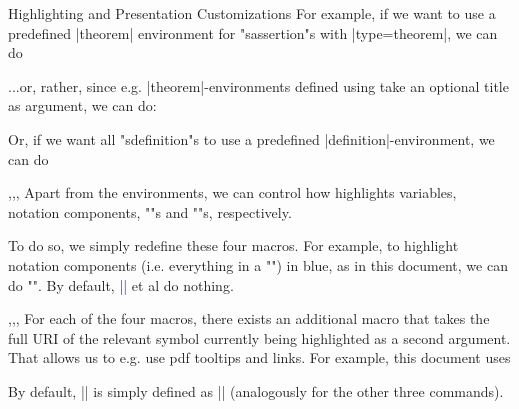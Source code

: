 \begin{sfragment}[id=sec.customhighlight]{Highlighting and Presentation Customizations}
    For example, if we want to use a predefined |theorem| environment
    for \stexcode"sassertion"s with |type=theorem|, we can do
    \begin{latexcode}[gobble=6]
      \stexpatchassertion[theorem]{\begin{theorem}}{\end{theorem}}
    \end{latexcode}
    ...or, rather, since e.g. |theorem|-environments defined using
     take an optional title as argument, we can do:
    \begin{latexcode}[gobble=6]
      \stexpatchassertion[theorem]
        {\ifx\sassertiontitle\@empty
            \begin{theorem}
          \else
            \begin{theorem}[\sassertiontitle]
        \fi}
        {\end{theorem}}    
    \end{latexcode}

    Or, if we want all \stexcode"sdefinition"s to use a predefined
    |definition|-environment, we can do
    \begin{latexcode}[gobble=6]
      \stexpatchdefinition
        {\ifx\sdefinitiontitle\@empty
            \begin{definition}
          \else
            \begin{definition}[\sdefinitiontitle]
        \fi}
        {\end{definition}}
    \end{latexcode}

    \begin{function}{\compemph,\varemph,\symrefemph,}
      Apart from the environments, we can control how \sTeX highlights
      variables, notation components, \stexcode"\symref"s and
      \stexcode""s, respectively.

      To do so, we simply redefine these four macros. For example,
      to highlight notation components (i.e. everything in a 
      \stexcode"\comp") in blue, as in this document, we can do
      \stexcode"\def\compemph#1{\textcolor{blue}{#1}}".
      By default, |\compemph| et al do nothing.
    \end{function}

    \begin{function}{\compemph@uri,\varemph@uri,\symrefemph@uri,}
      For each of the four macros, there exists an additional macro that takes
      the full URI of the relevant symbol currently being highlighted
      as a second argument. That allows us to e.g. use pdf tooltips
      and links. For example, this document uses
      \begin{latexcode}[gobble=8]
        \protected{}
      \end{latexcode}
      By default, |\compemph@uri| is simply defined
      as || (analogously for the other three commands).
    \end{function}


\end{sfragment}
